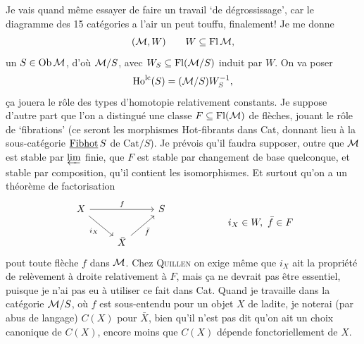 Je vais quand même essayer de faire un travail ‘de dégrossissage’, car le diagramme des
15 catégories a l'air un peut touffu, %
finalement! Je me donne
\[
(\mathcal{M},W) \qquad W\subseteq \mathrm{Fl}\,\mathcal{M},
\]
un $S\in\mathrm{Ob}\,\mathcal{M}$, d'où $\mathcal{M}/S$, avec $W_S\subseteq\mathrm{Fl}(\mathcal{M}/S)$ induit par $W$. On va poser
\[
\mathrm{Ho}^{\mathrm{lc}}(S)=(\mathcal{M}/S)W_S^{-1},
\]
ça jouera le rôle des types d'homotopie relativement constants. Je suppose d'autre part
que l'on a distingué une classe $F\subseteq\mathrm{Fl}(\mathcal{M})$ de flèches, jouant le rôle de ‘fibrations’ (ce
seront les morphismes Hot-fibrants dans Cat, donnant lieu à la sous-catégorie $\underline{\mathrm{Fibhot}}\, S$
de $\mathrm{Cat}/S$). Je prévois qu'il faudra
supposer, outre que $\mathcal{M}$ est stable par $\varprojlim$ finie, que $F$ est stable par changement de base
quelconque, et stable par composition, qu'il contient les isomorphismes. Et surtout qu'on
a un théorème de factorisation
\[
\begin{tikzcd}
X \arrow[rr, "f"] \arrow[dr, "i_X"'] & & S \\
& \bar{X} \arrow[ur, "\bar{f}"'] &
\end{tikzcd}
\qquad\qquad\qquad
i_X\in W,\ \bar{f}\in F
\]
pout %
toute flèche $f$ dans $\mathcal{M}$. Chez \textsc{Quillen} on exige même que $i_X$ ait la propriété de
relèvement à droite relativement à $F$, mais ça ne devrait pas être essentiel, puisque je n'ai
pas eu à utiliser ce fait dans Cat. Quand je travaille dans la catégorie $\mathcal{M}/S$, où $f$ est
sous-entendu pour un objet $X$ de ladite, je noterai (par abus de langage) $C(X)$ pour $\bar{X}$,
bien qu'il n'est pas dit qu'on ait un choix canonique de $C(X)$, encore moins que $C(X)$
dépende fonctoriellement de $X$.

